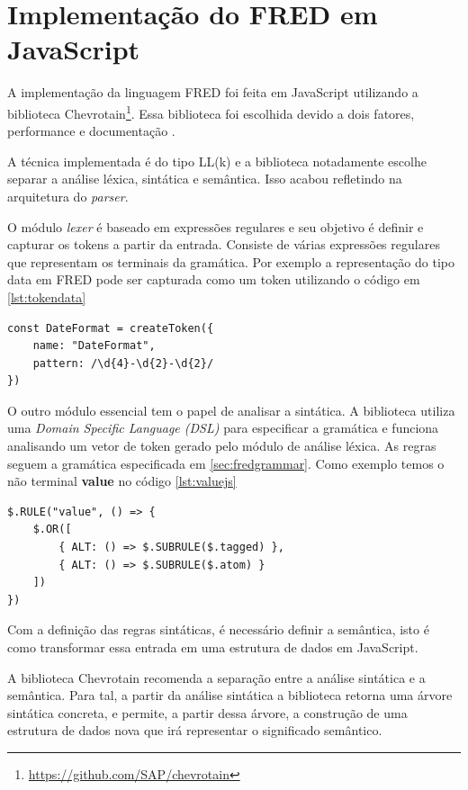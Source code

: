 \section{Implementação do FRED em JavaScript}

A implementação da linguagem FRED foi feita em JavaScript utilizando a biblioteca 
Chevrotain\footnote{\url{https://github.com/SAP/chevrotain}}. Essa biblioteca foi escolhida
devido a dois fatores, performance e documentação \cite{chevrotain}.

A técnica implementada é do tipo LL(k) e a biblioteca notadamente escolhe separar 
a análise léxica, sintática e semântica. Isso acabou refletindo na arquitetura do \textit{parser}. 

O módulo \textit{lexer} é baseado em expressões regulares e seu objetivo é definir e 
capturar os tokens a partir da entrada. Consiste de várias expressões regulares
que representam os terminais da gramática. Por exemplo a representação do tipo data em FRED pode
ser capturada como um token utilizando o código em \ref{lst:tokendata}

\begin{lstlisting}[caption=Definição do token para data,label={lst:tokendata}]
const DateFormat = createToken({
    name: "DateFormat",
    pattern: /\d{4}-\d{2}-\d{2}/
})
\end{lstlisting}

O outro módulo essencial tem o papel de analisar a sintática. A biblioteca utiliza uma 
\textit{Domain Specific Language (DSL)} para especificar a gramática e funciona analisando
um vetor de token gerado pelo módulo de análise léxica. As regras seguem a gramática especificada
em \ref{sec:fredgrammar}. Como exemplo temos o não terminal \textbf{value} no código \ref{lst:valuejs}

\begin{lstlisting}[caption=Definição da regra value em JavaScript,label={lst:valuejs}]
$.RULE("value", () => {
    $.OR([
        { ALT: () => $.SUBRULE($.tagged) },
        { ALT: () => $.SUBRULE($.atom) }
    ])
})
\end{lstlisting}

Com a definição das regras sintáticas, é necessário definir a semântica, isto é 
como transformar essa entrada em uma estrutura de dados em JavaScript. 

A biblioteca Chevrotain recomenda a separação entre a análise sintática e a semântica. Para tal,
a partir da análise sintática a biblioteca retorna uma árvore sintática concreta, e permite, a partir 
dessa árvore, a construção de uma estrutura de dados nova que irá representar o significado semântico.

